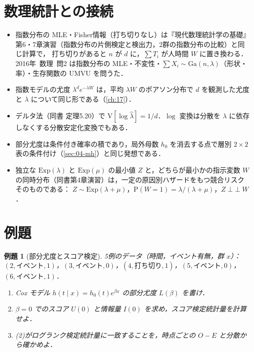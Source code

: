 \documentclass[a4paper,11pt,openany]{ltjsbook}
\newtheorem{reidai}{例題}[chapter]
\newcommand{\kakomonSM}[2]{\mbox{#1年 数理 問#2}}
\newcommand{\V}{\mathrm{V}}
\newcommand{\Prob}{\mathrm{P}}
\newcommand{\indep}{\mathop{\perp\!\!\!\perp}}
\newcommand{\Ga}{\mathrm{Ga}}
\newcommand{\Ex}{\mathrm{Exp}}
\begin{document}
\section{数理統計との接続}\label{sec:10-link}
\begin{linkbox}
\begin{itemize}
\item 指数分布の MLE・Fisher情報（打ち切りなし）は『現代数理統計学の基礎』第6・7章演習（指数分布の片側検定と検出力，2群の指数分布の比較）と同じ計算で，
      打ち切りがあると $n$ が $d$ に，$\sum T_i$ が人時間 $W$ に置き換わる．
      \kakomonSM{2016}{2} は指数分布の MLE・不変性・$\sum X_i\sim\Ga(n,\lambda)$（形状・率）・生存関数の UMVU を問うた．
\item 指数モデルの尤度 $\lambda^de^{-\lambda W}$ は，平均 $\lambda W$ のポアソン分布で $d$ を観測した尤度と $\lambda$ について同じ形である（\cref{ch:17}）．
\item デルタ法（同書 定理5.20）で $\V[\log\hat\lambda]=1/d$．$\log$ 変換は分散を $\lambda$ に依存しなくする分散安定化変換でもある．
\item 部分尤度は条件付き確率の積であり，局外母数 $h_0$ を消去する点で層別 $2\times2$ 表の条件付け（\cref{sec:04-mh}）と同じ発想である．
\item 独立な $\Ex(\lambda)$ と $\Ex(\mu)$ の最小値 $Z$ と，どちらが最小かの指示変数 $W$ の同時分布（同書第4章演習）は，一定の原因別ハザードをもつ競合リスクそのものである：
      $Z\sim\Ex(\lambda+\mu)$，$\Prob(W=1)=\lambda/(\lambda+\mu)$，$Z\indep W$．
\end{itemize}
\end{linkbox}

\section{例題}\label{sec:10-ex}
\begin{reidai}[部分尤度とスコア検定]\label{reidai:10-1}
5例のデータ（時間，イベント有無，群 $x$）：$(2,\text{イベント},1)$，$(3,\text{イベント},0)$，$(4,\text{打ち切り},1)$，$(5,\text{イベント},0)$，$(6,\text{イベント},1)$．
\begin{enumerate}[label=(\arabic*)]
\item Cox モデル $h(t\mid x)=h_0(t)e^{\beta x}$ の部分尤度 $L(\beta)$ を書け．
\item $\beta=0$ でのスコア $U(0)$ と情報量 $I(0)$ を求め，スコア検定統計量を計算せよ．
\item (2)がログランク検定統計量に一致することを，時点ごとの $O-E$ と分散から確かめよ．
\end{enumerate}
\end{reidai}
\end{document}
